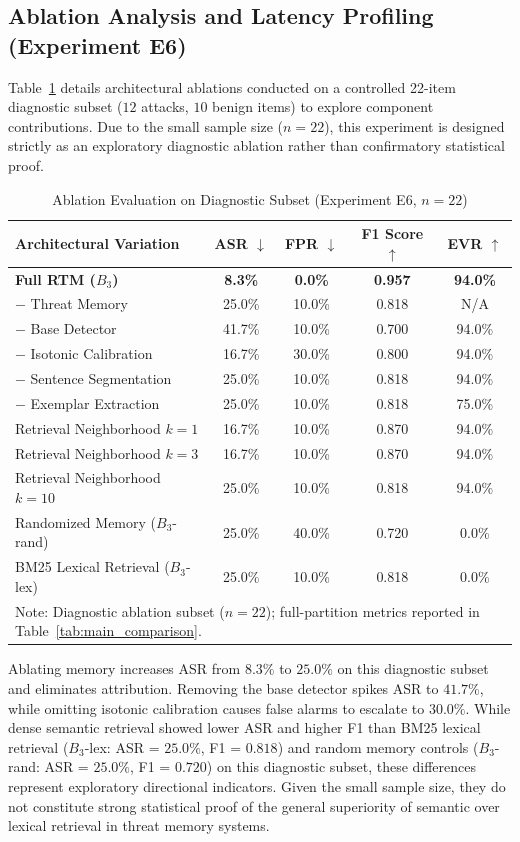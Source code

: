 \documentclass[conference]{IEEEtran}
\begin{document}
\subsection{Ablation Analysis and Latency Profiling (Experiment E6)}
Table~\ref{tab:ablation} details architectural ablations conducted on a controlled 22-item diagnostic subset ($12$ attacks, $10$ benign items) to explore component contributions. Due to the small sample size ($n = 22$), this experiment is designed strictly as an exploratory diagnostic ablation rather than confirmatory statistical proof.

\begin{table}[t]
\centering
\caption{Ablation Evaluation on Diagnostic Subset (Experiment E6, $n=22$)}
\label{tab:ablation}
\begin{tabular}{l c c c c}
\hline
\textbf{Architectural Variation} & \textbf{ASR} $\downarrow$ & \textbf{FPR} $\downarrow$ & \textbf{F1 Score} $\uparrow$ & \textbf{EVR} $\uparrow$ \\
\hline
\textbf{Full RTM ($B_3$)} & \textbf{8.3\%} & \textbf{0.0\%} & \textbf{0.957} & \textbf{94.0\%} \\
$-$ Threat Memory & 25.0\% & 10.0\% & 0.818 & N/A \\
$-$ Base Detector & 41.7\% & 10.0\% & 0.700 & 94.0\% \\
$-$ Isotonic Calibration & 16.7\% & 30.0\% & 0.800 & 94.0\% \\
$-$ Sentence Segmentation & 25.0\% & 10.0\% & 0.818 & 94.0\% \\
$-$ Exemplar Extraction & 25.0\% & 10.0\% & 0.818 & 75.0\% \\
Retrieval Neighborhood $k=1$ & 16.7\% & 10.0\% & 0.870 & 94.0\% \\
Retrieval Neighborhood $k=3$ & 16.7\% & 10.0\% & 0.870 & 94.0\% \\
Retrieval Neighborhood $k=10$ & 25.0\% & 10.0\% & 0.818 & 94.0\% \\
Randomized Memory ($B_3$-rand) & 25.0\% & 40.0\% & 0.720 & 0.0\% \\
BM25 Lexical Retrieval ($B_3$-lex) & 25.0\% & 10.0\% & 0.818 & 0.0\% \\
\hline
\multicolumn{5}{l}{\small Note: Diagnostic ablation subset ($n=22$); full-partition metrics reported in Table~\ref{tab:main_comparison}.} \\
\hline
\end{tabular}
\end{table}

Ablating memory increases ASR from $8.3\%$ to $25.0\%$ on this diagnostic subset and eliminates attribution. Removing the base detector spikes ASR to $41.7\%$, while omitting isotonic calibration causes false alarms to escalate to $30.0\%$. While dense semantic retrieval showed lower ASR and higher F1 than BM25 lexical retrieval ($B_3$-lex: ASR = $25.0\%$, F1 = $0.818$) and random memory controls ($B_3$-rand: ASR = $25.0\%$, F1 = $0.720$) on this diagnostic subset, these differences represent exploratory directional indicators. Given the small sample size, they do not constitute strong statistical proof of the general superiority of semantic over lexical retrieval in threat memory systems.
\end{document}

